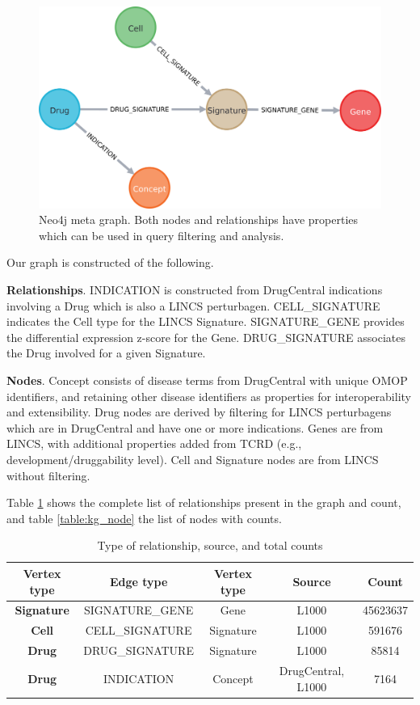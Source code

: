 \begin{figure}
	\includegraphics[width=\textwidth]{figures/kgap/KGAP_neo4jmetagraph.png}
	\caption{Neo4j meta graph. Both nodes and relationships have properties which can be used in query filtering and analysis.}
	\label{fig:neo4jmetagraph}
\end{figure}

Our graph is constructed of the following.

\textbf{Relationships}. INDICATION is constructed from DrugCentral indications  involving a Drug which is also a LINCS perturbagen. CELL\_SIGNATURE indicates the Cell type for the LINCS Signature. SIGNATURE\_GENE provides the differential expression z-score for the Gene. DRUG\_SIGNATURE associates the Drug involved for a given Signature.

\textbf{Nodes}. Concept consists of disease terms from DrugCentral with unique OMOP\cite{Hripcsak2019-ho} identifiers, and retaining other disease identifiers as properties for interoperability and extensibility. Drug nodes are derived by filtering for LINCS perturbagens which are in DrugCentral and have one or more indications.  Genes are from LINCS, with additional properties added from TCRD (e.g., development/druggability level). Cell and Signature nodes are from LINCS without filtering.

Table \ref{table:kg_rel} shows the complete list of relationships present in the graph and count, and table \ref{table:kg_node} the list of nodes with counts.

\begin{table}
\caption{Type of relationship, source, and total counts}
\begin{center}
\begin{tabular}{ |c|c|c|c|c| } 
\hline
\textbf{Vertex type} & \textbf{Edge type} & \textbf{Vertex type} & \textbf{Source} & \textbf{Count} \\ 
\hline
\textbf{Signature} & SIGNATURE\_GENE & Gene & L1000 & 45623637 \\ 
\textbf{Cell} & CELL\_SIGNATURE & Signature & L1000 & 591676 \\ 
\textbf{Drug} & DRUG\_SIGNATURE & Signature & L1000 & 85814 \\ 
\textbf{Drug} & INDICATION & Concept & DrugCentral, L1000 & 7164 \\ 
\hline
\end{tabular}
\end{center}
\label{table:kg_rel}
\end{table}

